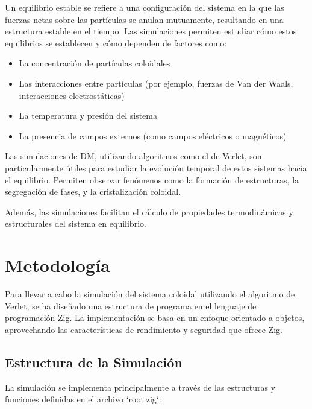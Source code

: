 \documentclass[twocolumn]{article}
\begin{document}
Un equilibrio estable se refiere a una configuración del sistema en la que las fuerzas netas sobre las partículas se anulan mutuamente, resultando en una estructura estable en el tiempo. Las simulaciones permiten estudiar cómo estos equilibrios se establecen y cómo dependen de factores como:

\begin{itemize}
    \item La concentración de partículas coloidales
    \item Las interacciones entre partículas (por ejemplo, fuerzas de Van der Waals, interacciones electrostáticas)
    \item La temperatura y presión del sistema
    \item La presencia de campos externos (como campos eléctricos o magnéticos)
\end{itemize}

Las simulaciones de DM, utilizando algoritmos como el de Verlet, son particularmente útiles para estudiar la evolución temporal de estos sistemas hacia el equilibrio. Permiten observar fenómenos como la formación de estructuras, la segregación de fases, y la cristalización coloidal.

Además, las simulaciones facilitan el cálculo de propiedades termodinámicas y estructurales del sistema en equilibrio.

\section{Metodología}
Para llevar a cabo la simulación del sistema coloidal utilizando el algoritmo de Verlet, se ha diseñado una estructura de programa en el lenguaje de programación Zig. La implementación se basa en un enfoque orientado a objetos, aprovechando las características de rendimiento y seguridad que ofrece Zig.

\subsection*{Estructura de la Simulación}
La simulación se implementa principalmente a través de las estructuras y funciones definidas en el archivo `root.zig`:
\end{document}
